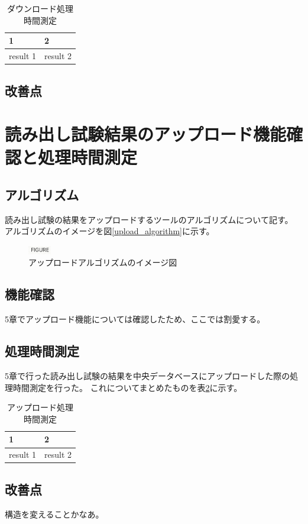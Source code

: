 \begin{table}[tbp]
\begin{center}
\caption[ダウンロード処理時間測定]{ダウンロード処理時間測定}
\label{download_measurement}
  \begin{tabular}{|ll|} \hline
    1 & 2 \\ \hline
    result 1 & result 2 \\ \hline 
  \end{tabular}
\end{center}
\end{table}

\subsection{改善点}

\section{読み出し試験結果のアップロード機能確認と処理時間測定}
\subsection{アルゴリズム}
読み出し試験の結果をアップロードするツールのアルゴリズムについて記す。
アルゴリズムのイメージを図\ref{upload_algorithm}に示す。

\begin{figure}[bpt]\centering
\includegraphics[width=1cm]{figure}
\caption[アップロードアルゴリズムのイメージ図]{アップロードアルゴリズムのイメージ図}
\label{download_algorithm}
\end{figure}

\subsection{機能確認}
5章でアップロード機能については確認したため、ここでは割愛する。

\subsection{処理時間測定}
5章で行った読み出し試験の結果を中央データベースにアップロードした際の処理時間測定を行った。
これについてまとめたものを表\ref{upload_measurement}に示す。

\begin{table}[tbp]
\begin{center}
\caption[アップロード処理時間測定]{アップロード処理時間測定}
\label{upload_measurement}
  \begin{tabular}{|ll|} \hline
    1 & 2 \\ \hline
    result 1 & result 2 \\ \hline 
  \end{tabular}
\end{center}
\end{table}

\subsection{改善点}
構造を変えることかなあ。
